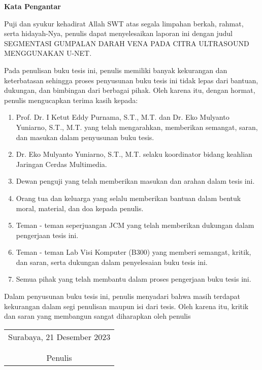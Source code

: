 \begin{center}
\Large\textbf{Kata Pengantar}
\end{center}
\vspace{2ex}
Puji dan syukur kehadirat Allah SWT atas segala limpahan berkah, rahmat, serta hidayah-Nya, penulis  dapat menyelesaikan laporan ini dengan judul SEGMENTASI GUMPALAN DARAH VENA PADA CITRA ULTRASOUND MENGGUNAKAN U-NET.

Pada penulisan buku tesis ini, penulis memiliki banyak kekurangan dan keterbatasan sehingga proses penyusunan buku tesis ini tidak lepas dari bantuan, dukungan, dan bimbingan dari berbagai pihak. Oleh karena itu, dengan hormat, penulis mengucapkan terima kasih kepada:

\begin{enumerate}
	\item Prof. Dr. I Ketut Eddy Purnama, S.T., M.T. dan Dr. Eko Mulyanto Yuniarno, S.T., M.T. yang telah mengarahkan, memberikan semangat, saran, dan masukan dalam penyusunan buku tesis.
	\item Dr. Eko Mulyanto Yuniarno, S.T., M.T. selaku koordinator bidang keahlian Jaringan Cerdas Multimedia.
	\item Dewan penguji yang telah memberikan masukan dan arahan dalam tesis ini.
	\item Orang tua dan keluarga yang selalu memberikan bantuan dalam bentuk moral, material, dan doa kepada penulis.
	\item Teman - teman seperjuangan JCM yang telah memberikan dukungan dalam pengerjaan tesis ini.
	\item Teman - teman Lab Visi Komputer (B300) yang memberi semangat, kritik, dan saran, serta dukungan dalam penyelesaian buku tesis ini.
	\item Semua pihak yang telah membantu dalam proses pengerjaan buku tesis ini.
\end{enumerate}

 \vspace{1ex}
Dalam penyusunan buku tesis ini, penulis menyadari bahwa masih terdapat kekurangan dalam segi penulisan maupun isi dari tesis. Oleh karena itu, kritik dan saran yang membangun sangat diharapkan oleh penulis
	\vspace{26pt}
	\begin{flushright}
		\begin{tabular}[b]{c}
			Surabaya, 21 Desember 2023
			\\
			\\
			\\
			Penulis
		\end{tabular}
	\end{flushright}
